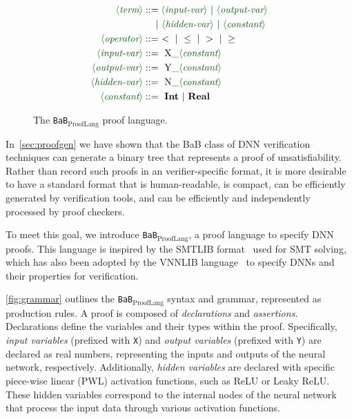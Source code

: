 \documentclass[oneside,11pt,dvipsnames]{book}
\numberwithin{equation}{section}
\theoremstyle{definition}
\theoremstyle{remark}
\newcommand{\functiontextformat}[1]{\textrm{\texttt{#1}}}
\newcommand{\prooflang}{\texttt{BaB$_{\text{ProofLang}}$}}
\begin{document}
\begin{figure}
{\begin{align*}
    \lra{term}          &::= \lra{input-var} \ | \ \lra{output-var} \\ 
                        & \quad ~| \ \lra{hidden-var} \ | \ \lra{constant} \\
    \lra{operator}      &::= ~ < \ | \ \leq \ | \ > \ | \ \geq \\
    \lra{input-var}     &::= ~\text{X\_}\lra{constant} \\
    \lra{output-var}    &::= ~\text{Y\_}\lra{constant} \\
    \lra{hidden-var}    &::= ~\text{N\_}\lra{constant} \\
    \lra{constant}      &::= ~\textbf{Int} \ | \ \textbf{Real}
\end{align*}
}
\caption{The \prooflang{} proof language.}\label{fig:grammar}
\end{figure}

In~\autoref{sec:proofgen} we have shown that the BaB class of DNN verification techniques  can generate a binary tree that represents a proof of unsatisfiability.
Rather than record such proofs in an verifier-specific format, it is more desirable to have a standard format
that is human-readable, is compact, can be efficiently generated by verification tools, and can
be efficiently and independently processed by proof checkers.  

To meet this goal, we introduce \prooflang{}, a proof language to specify DNN proofs.
This language is inspired by the SMTLIB format~\cite{barrett2010smt} used for SMT solving, which has also been adopted by the  VNNLIB language~\cite{vnnlib} to specify DNNs and their properties for  verification.


\autoref{fig:grammar} outlines the \prooflang{} syntax and grammar, represented as production rules. 
A proof is composed of \textit{declarations} and \textit{assertions}. Declarations define the variables and their types within the proof. Specifically, \textit{input variables} (prefixed with \functiontextformat{X}) and \textit{output variables} (prefixed with \functiontextformat{Y}) are declared as real numbers, representing the inputs and outputs of the neural network, respectively. Additionally, \textit{hidden variables} are declared with specific piece-wise linear (PWL) activation functions, such as ReLU or Leaky ReLU. These hidden variables correspond to the internal nodes of the neural network that process the input data through various activation functions.
\end{document}
